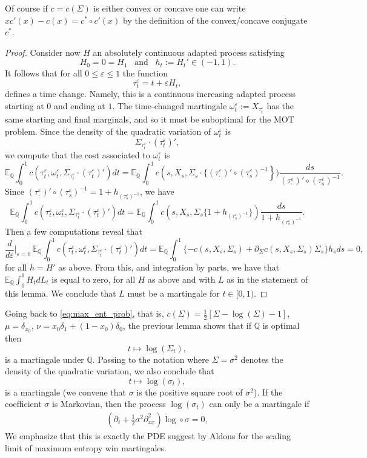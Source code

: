 \documentclass[reqno, a4paper]{amsart}
\theoremstyle{remark}
\newcommand{\Q}{\mathbb{Q}}
\newcommand{\EE}{{\mathbb E}}
\newcommand{\1}{\mathbbm 1}
\renewcommand{\epsilon}{\varepsilon}
\numberwithin{equation}{section}
\numberwithin{theorem}{section}
\begin{document}
Of course if $c=c(\Sigma)$ is either convex or concave one can write $xc'(x)-c(x)=c^*\circ c'(x)$ {by the definition of the convex/concave conjugate $c^*$}.

\begin{proof} Consider now $H$ an absolutely continuous adapted process satisfying
$$H_0=0=H_1\,\,\,\text{ and }\,\,\, h_t:=H_t' \in (-1,1).$$
It follows that for all $0\leq \epsilon\leq 1$ the function
$$\tau^\epsilon_t= t+\epsilon H_t,$$
defines a time change. Namely, this is a continuous  increasing adapted process  starting at $0$ and ending at $1$. The time-changed martingale $\omega^\epsilon_t:=X_{\tau^\epsilon_t}$ has the same starting and final marginals, and so it must be suboptimal for the MOT problem. Since the density of the quadratic variation of $\omega^\epsilon_t$ is $$\Sigma_{\tau^\epsilon_t}\cdot(\tau^\epsilon_t)',$$ we compute that the cost associated to $\omega^\epsilon_t$ is
$$\EE_\Q\int_0^1 c\left (\tau^\epsilon_t,\omega^\epsilon_t,\Sigma_{\tau^\epsilon_t}\cdot(\tau^\epsilon_t)'\right )dt = \EE_\Q\int_0^1 c\left (s,X_s,\Sigma_{s}\cdot\{(\tau^\epsilon_\cdot)'\circ (\tau^\epsilon_s)^{-1}\right \})\frac{ds}{(\tau^\epsilon_\cdot)'\circ (\tau^\epsilon_s)^{-1}}.$$
Since $(\tau^\epsilon_\cdot)'\circ (\tau^\epsilon_s)^{-1}=1+h_{(\tau^\epsilon_s)^{-1}}$, we have
%
$$\EE_\Q\int_0^1 c\left (\tau^\epsilon_t,\omega^\epsilon_t,\Sigma_{\tau^\epsilon_t}\cdot(\tau^\epsilon_t)'\right )dt =   \EE_\Q\int_0^1 c\left (s,X_s,\Sigma_{s}\{1+h_{(\tau^\epsilon_s)^{-1}}\}\right )\frac{ds}{1+h_{(\tau^\epsilon_s)^{-1}}}.$$
Then a few computations reveal that
$$\frac{d}{d\epsilon}\Big\vert_{\epsilon=0}\,\EE_\Q\int_0^1 c\left (\tau^\epsilon_t,\omega^\epsilon_t,\Sigma_{\tau^\epsilon_t}\cdot(\tau^\epsilon_t)'\right )dt=\EE_\Q\int_0^1\{-c(s,X_s,\Sigma_s)+ \partial_\Sigma c(s,X_s,\Sigma_s)\Sigma_s\}h_sds =0,$$
for all $h=H'$ as above. From this, and integration by parts, we have that  $\EE_\Q\int_0^1 H_t dL_t$ is equal to zero, for all $H$ as above and with $L$ as in the statement of this lemma. We conclude that $L$ must be a martingale for $t\in[0,1)$.
\end{proof}


Going back to \eqref{eq:max_ent_prob}, that is,  $c(\Sigma)=\frac{1}{2}[\Sigma-\log(\Sigma)-1]$, $\mu=\delta_{x_0}$, $\nu=x_0\delta_1+(1-x_0)\delta_0$, the previous lemma shows that if $\Q$ is optimal then \[t\mapsto \log(\Sigma_t),\]
 is a martingale under $\Q$. Passing to the notation where $\Sigma=\sigma^2$ denotes the density of the quadratic variation, we also conclude that 
\[t\mapsto \log(\sigma_t),\]
is a martingale (we convene that $\sigma$ is the positive square root of $\sigma^2$). If the coefficient $\sigma$ is Markovian, then the process $\log(\sigma_t)$ can only be a martingale if
\begin{align}
\left(\partial_t+\frac{1}{2}\sigma^2\partial^2_{xx}\right)\log\circ\sigma =0, \label{eq:foc_FP1}
\end{align}
We emphasize that this is exactly the PDE suggest by Aldous \cite{Al22a} for the scaling limit of maximum entropy win martingales. 
\end{document}

